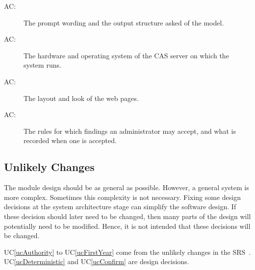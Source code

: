 \documentclass[12pt, titlepage]{article}
\newcounter{acnum}
\newcommand{\actheacnum}{AC\theacnum}
\newcommand{\uref}[1]{UC\ref{#1}}
\begin{document}
\begin{description}
\item[ \actheacnum \label{acPrompt}:] The prompt wording
  and the output structure asked of the model.
\item[ \actheacnum \label{acHardware}:] The hardware and
  operating system of the CAS server on which the system runs.
\item[ \actheacnum \label{acLayout}:] The layout and
  look of the web pages.
\item[ \actheacnum \label{acOverride}:] The rules for
  which findings an administrator may accept, and what is recorded when one is
  accepted.
\end{description}




\subsection{Unlikely Changes} \label{SecUchange}

The module design should be as general as possible. However, a general system is
more complex. Sometimes this complexity is not necessary. Fixing some design
decisions at the system architecture stage can simplify the software design. If
these decision should later need to be changed, then many parts of the design
will potentially need to be modified. Hence, it is not intended that these
decisions will be changed.

\uref{ucAuthority} to \uref{ucFirstYear} come from the unlikely changes in the
SRS~\citep{TeamBVSH2026SRS}. \uref{ucDeterministic} and \uref{ucConfirm} are
design decisions.
\end{document}
